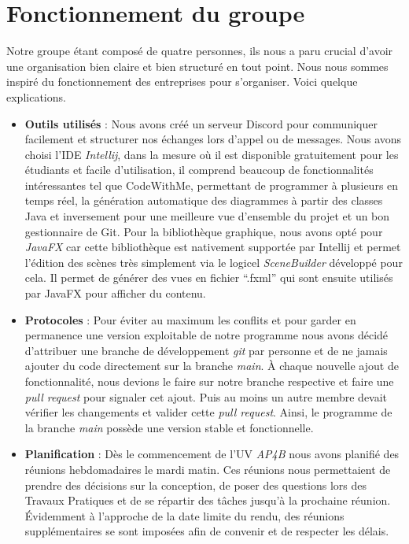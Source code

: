 \newpage
\section{Fonctionnement du groupe}

Notre groupe étant composé de quatre personnes, ils nous a paru crucial d'avoir une organisation bien claire et bien structuré en tout point. Nous nous sommes inspiré du fonctionnement des entreprises pour s'organiser. Voici quelque explications.

\begin{itemize}
    \item[\textbullet]
    \textbf{Outils utilisés} : 
    Nous avons créé un serveur Discord pour communiquer facilement et structurer nos échanges lors d'appel ou de messages. Nous avons choisi l'IDE \textit{Intellij}, dans la mesure où il est disponible gratuitement pour les étudiants et facile d'utilisation, il comprend beaucoup de fonctionnalités intéressantes tel que CodeWithMe, permettant de programmer à plusieurs en temps réel, la génération automatique des diagrammes à partir des classes Java et inversement pour une meilleure vue d'ensemble du projet et un bon gestionnaire de Git. Pour la bibliothèque graphique, nous avons opté pour \textit{JavaFX} car cette bibliothèque est nativement supportée par Intellij et permet l'édition des scènes très simplement via le logicel \textit{SceneBuilder} développé pour cela. Il permet de générer des vues en fichier \enquote{.fxml} qui sont ensuite utilisés par JavaFX pour afficher du contenu.
    \linebreak
    
    \item[\textbullet]
    \textbf{Protocoles} : 
    Pour éviter au maximum les conflits et pour garder en permanence une version exploitable de notre programme nous avons décidé d'attribuer une branche de développement \textit{git} par personne et de ne jamais ajouter du code directement sur la branche \textit{main}. À chaque nouvelle ajout de fonctionnalité, nous devions le faire sur notre branche respective et faire une \textit{pull request} pour signaler cet ajout. Puis au moins un autre membre devait vérifier les changements et valider cette \textit{pull request}. Ainsi, le programme de la branche \textit{main} possède une version stable et fonctionnelle.
    \linebreak
    
    \item[\textbullet]
    \textbf{Planification} :
    Dès le commencement de l'UV \textit{AP4B} nous avons planifié des réunions hebdomadaires le mardi matin. Ces réunions nous permettaient de prendre des décisions sur la conception, de poser des questions lors des Travaux Pratiques et de se répartir des tâches jusqu'à la prochaine réunion. Évidemment à l'approche de la date limite du rendu, des réunions supplémentaires se sont imposées afin de convenir et de respecter les délais.
    \linebreak
    

\end{itemize}
